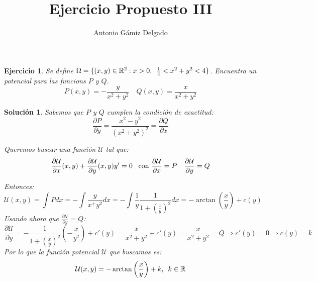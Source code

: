 \documentclass[12pt]{article}
\newcommand{\R}[1][]{\mathbb{R}^{#1}}
\newcommand{\U}{\mathcal{U}}
\newtheorem*{theorem*}{Ejercicio}
\newtheorem*{proof*}{Solución}
\newcommand{\p}[2]{\frac{\partial#1}{\partial#2}}
\begin{document}

\author{Antonio Gámiz Delgado}
\title{Ejercicio Propuesto III}
\maketitle


\begin{theorem*}
Se define $\Omega=\{(x,y)\in\R[2]:x>0, \enskip \frac{1}{4}<x^2+y^2<4\}$. Encuentra un potencial para las funcions $P$ y $Q$.
\[
P(x,y)=-\frac{y}{x^2+y^2} \quad Q(x,y)=\frac{x}{x^2+y^2}
\]
\end{theorem*}

\begin{proof*}
Sabemos que $P$ y $Q$ cumplen la condición de exactitud:
\[
\p{P}{y}=\frac{x^2-y^2}{(x^2+y^2)^2}=\p{Q}{x}
\]

Queremos buscar una función $\U$ tal que:
\[
\p{\U}{x}(x,y)+\p{\U}{y}(x,y)y'=0 \enskip \text{ con } \p{\U}{x}=P \quad \p{\U}{y}=Q
\]

Entonces:
\[
\U(x,y)=\int Pdx=-\int \frac{y}{x^+y^2}dx=-\int \frac{1}{y}\frac{1}{1+(\frac{x}{y})^2}dx=-\arctan\left(\frac{x}{y}\right)+c(y) 
\]
Usando ahora que $\displaystyle\p{\U}{y}=Q$:
\[
\p{\U}{y}=-\frac{1}{1+(\frac{x}{y})^2}\left(-\frac{x}{y^2}\right)+c'(y)=\frac{x}{x^2+y^2}+c'(y)=\frac{x}{x^2+y^2}=Q \Longrightarrow c'(y)=0 \Longrightarrow c(y)=k
\]
Por lo que la función potencial $\U$ que buscamos es:
\[
\U(x,y)=-\arctan\left(\frac{x}{y}\right)+k, \enskip k\in\R
\]
\end{proof*}
\end{document}
